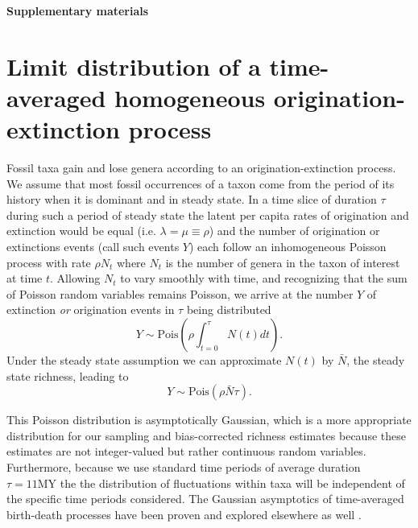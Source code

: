 \documentclass[12pt]{article}
\let\citep=\cite
\begin{document}
\clearpage

\newcommand{\beginsupplement}{%
  \setcounter{table}{0}
  \renewcommand{\thetable}{S\arabic{table}}%
  \setcounter{figure}{0}
  \renewcommand{\thefigure}{S\arabic{figure}}%
  \setcounter{section}{0}
  \renewcommand{\thesection}{S\arabic{section}}%
}

\beginsupplement

\begin{center}
{\LARGE \bf Supplementary materials}
\end{center}
\vspace{2em}

\section{Limit distribution of a time-averaged homogeneous
  origination-extinction process}
\label{sec:suppLimitDist}

Fossil taxa gain and lose genera according to an
origination-extinction process. We assume that most fossil occurrences
of a taxon come from the period of its history when it is dominant and
in steady state. In a time slice of duration $\tau$ during such a
period of steady state the latent per capita rates of origination and
extinction would be equal (i.e. $\lambda = \mu \equiv \rho$) and the
number of origination or extinctions events (call such events $Y$)
each follow an inhomogeneous Poisson process with rate $\rho N_t$
where $N_t$ is the number of genera in the taxon of interest at time
$t$. Allowing $N_t$ to vary smoothly with time, and recognizing that
the sum of Poisson random variables remains Poisson, we arrive at the
number $Y$ of extinction \emph{or} origination events in $\tau$ being
distributed
\begin{equation}
  \label{eq:eventPois1}
  Y \sim \text{Pois}\left(\rho \int_{t=0}^\tau N(t) dt\right).
\end{equation}
Under the steady state assumption we can approximate $N(t)$ by
$\bar{N}$, the steady state richness, leading to
\begin{equation}
  \label{eq:eventPois2}
  Y \sim \text{Pois}(\rho \bar{N} \tau).
\end{equation}

This Poisson distribution is asymptotically Gaussian, which is a more
appropriate distribution for our sampling and bias-corrected richness
estimates because these estimates are not integer-valued but rather
continuous random variables. Furthermore, because we use standard time
periods of average duration $\tau = 11\text{MY}$ the the distribution
of fluctuations within taxa will be independent of the specific time
periods considered. The Gaussian asymptotics of time-averaged
birth-death processes have been proven and explored elsewhere as well
\citep{keilson1970, grassmann1987}.
\end{document}
